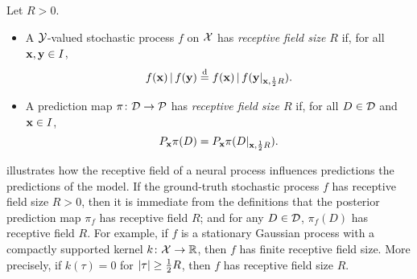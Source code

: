 \documentclass[12pt]{report}
\begin{document}
\begin{definition}
    \label{def:receptive_field}
    Let $R > 0$.
    \begin{itemize}
        \item
            A $\mathcal{Y}$-valued stochastic process $f$ on $\mathcal{X}$ has \emph{receptive field size $R$}
            if, for all $\mathbf{x}, \mathbf{y} \in I$,
            \begin{equation}
                f(\vx) \cond f(\vy) \disteq f(\vx) \cond f(\vy|_{\vx,\frac 12R}).
            \end{equation}
        \item 
            A prediction map $\pi \colon \mathcal{D} \to \mathcal{P}$ has \emph{receptive field size $R$}
            if, for all $D \in \mathcal{D}$ and $\mathbf{x} \in I$,
            \begin{equation}
                P_{\mathbf{x}} \pi(D) = P_{\mathbf{x}} \pi(D|_{\mathbf{x}, \frac12 R}).
            \end{equation}
    \end{itemize}
\end{definition}

 illustrates how the receptive field of a neural process influences predictions the predictions of the model.
If the ground-truth stochastic process $f$ has receptive field size $R > 0$, then it is immediate from the definitions that
the posterior prediction map $\pi_f$ has receptive field $R$; and
for any $D \in \mathcal{D}$, $\pi_f(D)$ has receptive field $R$.
For example, if $f$ is a stationary Gaussian process with a compactly supported kernel $k \colon \mathcal{X} \to \mathbb{R}$, then $f$ has finite receptive field size.
More precisely, if $k(\tau) = 0$ for $\lvert\tau\rvert \ge \tfrac12 R$, then $f$ has receptive field size $R$.
\end{document}
